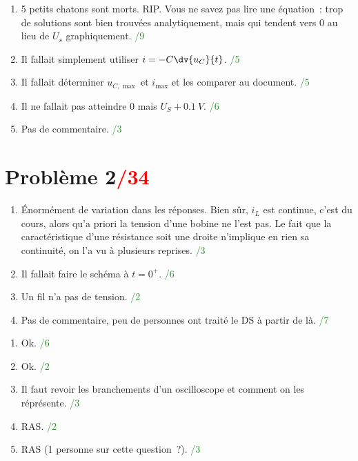 \documentclass[a4paper, 10pt, final, garamond]{book}
\begin{document}
\begin{enumerate}
    \item 5 petits chatons sont morts. RIP. Vous ne savez pas lire une
        équation~: trop de solutions sont bien trouvées analytiquement, mais
        qui tendent vers 0 au lieu de $U_s$ graphiquement. \hfill
        \textcolor{ForestGreen}{/9}

    \item Il fallait simplement utiliser $i = -C \dv{u_C}{t}$. \hfill
        \textcolor{ForestGreen}{/5}

    \item Il fallait déterminer $u_{C, \max}$ et $i_{\max}$ et les comparer au
        document. \hfill \textcolor{ForestGreen}{/5}

    \item Il ne fallait pas atteindre $0$ mais $U_S + \SI{0.1}{V}$. \hfill
        \textcolor{ForestGreen}{/6}

    \item Pas de commentaire. \hfill \textcolor{ForestGreen}{/3}
\end{enumerate}

\section{Problème 2\hfill \textcolor{red}{/34}}

\begin{enumerate}
    \item Énormément de variation dans les réponses. Bien sûr, $i_L$ est
        continue, c'est du cours, alors qu'a priori la tension d'une bobine ne
        l'est pas. Le fait que la caractéristique d'une résistance soit une
        droite n'implique en rien sa continuité, on l'a vu à plusieurs reprises.
        \hfill \textcolor{ForestGreen}{/3}

    \item Il fallait faire le schéma à $t = 0^+$. \hfill
        \textcolor{ForestGreen}{/6}

    \item Un fil n'a pas de tension. \hfill \textcolor{ForestGreen}{/2}

    \item Pas de commentaire, peu de personnes ont traité le DS à partir de
        là. \hfill \textcolor{ForestGreen}{/7}
\end{enumerate}

\begin{enumerate}[start=6]
    \item Ok. \hfill \textcolor{ForestGreen}{/6}

    \item Ok. \hfill \textcolor{ForestGreen}{/2}

    \item Il faut revoir les branchements d'un oscilloscope et comment on les
        réprésente. \hfill \textcolor{ForestGreen}{/3}

    \item RAS. \hfill \textcolor{ForestGreen}{/2}

    \item RAS (1 personne sur cette question~?). \hfill
        \textcolor{ForestGreen}{/3}
\end{enumerate}
\end{document}
